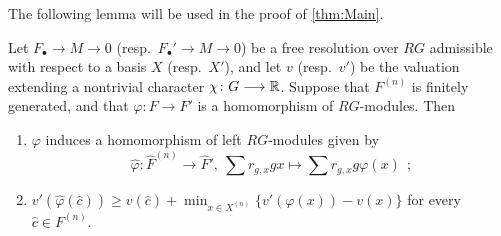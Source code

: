 \documentclass[11pt, letterpaper]{amsart}
\begin{document}
\smallskip

The following lemma will be used in the proof of \cref{thm:Main}.

\begin{lem} \label{lem:ExtendHom}
Let $F_\bullet \longrightarrow M \longrightarrow 0$ (resp.~$F_\bullet' \longrightarrow M \longrightarrow 0$) be a free resolution over $RG$ admissible with respect to a basis $X$ (resp.~$X'$), and let $v$ (resp.~$v'$) be the valuation extending a nontrivial character $\chi\colon G \longrightarrow \mathbb{R}$. Suppose that $F^{(n)}$ is finitely generated, and that $\varphi \colon F \longrightarrow F'$ is a homomorphism of $RG$-modules. Then
\begin{enumerate}[label=(\arabic*)]
    \item \label{item:extend} $\varphi$ induces a homomorphism of left $RG$-modules given by
    \[
        \widehat{\varphi} \colon \widehat{F}^{(n)} \longrightarrow \widehat{F}', \ \sum r_{g,x} gx \longmapsto \sum r_{g,x} g \varphi(x) \ \ ;
    \]
    \item \label{item:valIneq} $v'(\widehat{\varphi}(\hat c)) \geqslant v(\hat{c}) + \min_{x \in X^{(n)}} \{ v'(\varphi(x)) - v(x) \}$ for every $\hat{c} \in F^{(n)}$.
\end{enumerate}
\end{lem}
\end{document}
